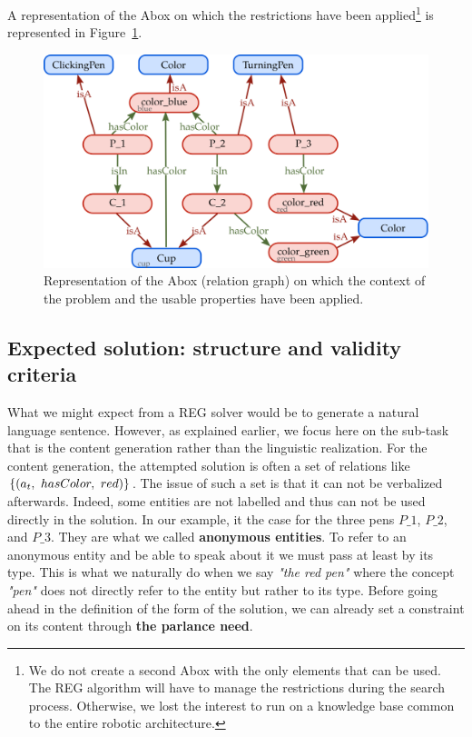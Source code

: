 A representation of the Abox on which the restrictions have been applied\footnote{We do not create a second Abox with the only elements that can be used. The REG algorithm will have to manage the restrictions during the search process. Otherwise, we lost the interest to run on a knowledge base common to the entire robotic architecture.} is represented in Figure~\ref{fig:chap4_kb_ctx}.

\begin{figure}[h!]
\centering
\includegraphics[scale=0.38]{figures/chapter4/pens_ctx.png}
\caption{\label{fig:chap4_kb_ctx} Representation of the Abox (relation graph) on which the context of the problem and the usable properties have been applied. }
\end{figure}

\subsection{Expected solution: structure and validity criteria}

What we might expect from a REG solver would be to generate a natural language sentence. However, as explained earlier, we focus here on the sub-task that is the content generation rather than the linguistic realization. For the content generation, the attempted solution is often a set of relations like $\{ (\goalindiv,\ hasColor,\ red)\}$. The issue of such a set is that it can not be verbalized afterwards. Indeed, some entities are not labelled and thus can not be used directly in the solution. In our example, it the case for the three pens $P\_1$, $P\_2$, and $P\_3$. They are what we called \textbf{anonymous entities}. To refer to an anonymous entity and be able to speak about it we must pass at least by its type. This is what we naturally do when we say \textit{"the red pen"} where the concept \textit{"pen"} does not directly refer to the entity but rather to its type. Before going ahead in the definition of the form of the solution, we can already set a constraint on its content through \textbf{the parlance need}.

